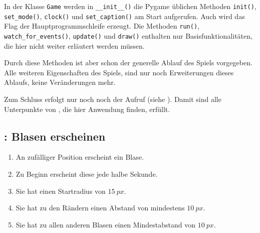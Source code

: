 In der Klasse \texttt{Game} werden in \texttt{\_\_init\_\_()} die Pygame üblichen Methoden \texttt{init()}, \texttt{set\_mode()}, \texttt{clock()} und \texttt{set\_caption()} am Start aufgerufen. Auch wird das Flag der Hauptprogrammschleife erzeugt. Die Methoden \texttt{run()}, \texttt{watch\_for\_events()}, \texttt{update()} und \texttt{draw()} enthalten nur Basisfunktionalitäten, die hier nicht weiter erläutert werden müssen. 

Durch diese Methoden ist aber schon der generelle Ablauf des Spiels vorgegeben. Alle weiteren Eigenschaften des Spiels, sind nur noch Erweiterungen dieses Ablaufs, keine Veränderungen mehr. 

Zum Schluss erfolgt nur noch noch der Aufruf (siehe ). 
Damit sind alle Unterpunkte von , die hier Anwendung finden, erfüllt.



\subsection{: Blasen erscheinen}

\begin{enumerate}
    \item An zufälliger Position erscheint ein Blase.\label{reqBlasenErscheinenZufall}
    \item Zu Beginn erscheint diese jede halbe Sekunde.\label{reqBlasenErscheinenIntervall}
    \item Sie hat einen Startradius von $15~px$.\label{reqBlasenErscheinenRadius}
    \item Sie hat zu den Rändern einen Abstand von mindestens $10~px$.\label{reqBlasenErscheinenAbstand}
    \item Sie hat zu allen anderen Blasen einen Mindestabstand von $10~px$.\label{reqBlasenErscheinenMindestabstand}
\end{enumerate}
\er


